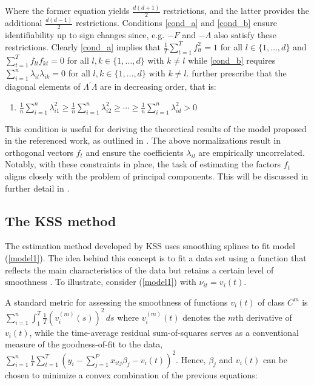 Where the former equation yields $\frac{d(d+1)}{2}$ restrictions, and the latter provides the additional $\frac{d(d-1)}{2}$ restrictions. Conditions \ref{cond_a} and \ref{cond_b} ensure identifiability up to sign changes since, e.g. $-F$ and $-\Lambda$ also satisfy these restrictions. Clearly \ref{cond_a} implies that   \(\frac{1}{T} \sum_{t=1}^T f_{l t}^2=1 \) for all \( l \in\{1, \ldots, d\} \) and \(\sum_{t=1}^T f_{l t} f_{k t}=0 \) for all \( l, k \in\{1, \ldots, d\} \) with \( k \neq l \) while \ref{cond_b} requires $\sum_{i=1}^n \lambda_{i l} \lambda_{i k}=0$ for all  $l, k \in\{1, \ldots, d\} \text { with } k \neq l$. \citet{kneip2012new} further prescribe that the diagonal elements of \( \Lambda^\prime \Lambda \) are in decreasing order, that is: 

\begin{enumerate}[label = (\alph*),resume]
    \item \(\frac{1}{n} \sum_{i=1}^n \lambda_{i 1}^2 \geq \frac{1}{n} \sum_{i=1}^n \lambda_{i 2}^2 \geq \cdots \geq \frac{1}{n} \sum_{i=1}^n \lambda_{i d}^2 > 0\) \label{cond_c}
\end{enumerate}

This condition is useful for deriving the theoretical results of the model proposed in the referenced work, as outlined in . The above normalizations result in orthogonal vectors \(f_t\) and ensure the coefficients \(\lambda_{il}\) are empirically uncorrelated. Notably, with these constraints in place, the task of estimating the factors \(f_t\) aligns closely with the problem of principal components. This will be discussed in further detail in .



\subsection{The \acl{KSS} \citeyearpar{kneip2012new} method}\label{kss}

The estimation method developed by \ac{KSS} \citeyearpar{kneip2012new} uses smoothing splines to fit model (\ref{model1}). The idea behind this concept is to fit a data set using a function that reflects the main characteristics of the data but retains a certain level of smoothness \citep{eubank1999nonparametric, de2001practical}. To illustrate, consider (\ref{model1}) with $\nu_{it} = v_i(t)$. 

A standard metric for assessing the smoothness of functions $v_i(t)$ of class $C^m$ is $\sum_{i=1}^n \int_1^T \frac{1}{T} \left(v_i^{(m)}(s)\right)^2  \, d s$ where $v_i^{(m)}(t)$ denotes the $m$th derivative of $v_i(t)$, while the time-average residual sum-of-squares serves as a conventional measure of the goodness-of-fit to the data, $\sum_{i=1}^n \frac{1}{T} \sum_{t=1}^T\left(y_i-  \sum_{j=1}^P x_{itj} \beta_j - v_i(t)\right)^2 $. Hence, $\beta_j$ and $v_i(t)$ can be chosen to minimize a convex combination of the previous equations:

